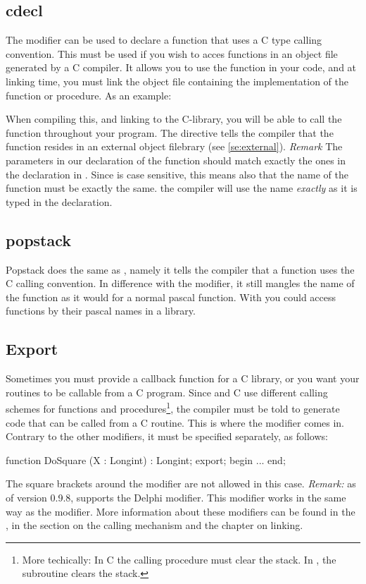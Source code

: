 \documentclass{report}
\begin{document}
\subsection{cdecl}
\label{se:cdecl}
The  modifier can be used to declare a function that uses a C
type calling convention. This must be used if you wish to acces functions in
an object file generated by a C compiler. It allows you to use the function in
your code, and at linking time, you must link the object file containing the
 implementation of the function or procedure.
As an example:
When compiling this, and linking to the C-library, you will be able to call
the  function throughout your program. The 
directive tells the compiler that the function resides in an external
object filebrary (see \ref{se:external}). 
{\em Remark} The parameters in our declaration of the  function should 
match exactly the ones in the declaration in . Since  is case 
sensitive, this means also that the name of the
function must be exactly the same. the \fpc compiler will use the name {\em
exactly} as it is typed in the declaration.
\subsection{popstack}
\label{se:popstack}
Popstack does the same as , namely it tells the \fpc compiler
that a function uses the C calling convention. In difference with the
 modifier, it still mangles the name of the function as it would 
for a normal pascal function.
With  you could access functions by their pascal names in a
library.
\subsection{Export}
Sometimes you must provide a callback function for a C library, or you want
your routines to be callable from a C program. Since \fpc and C use
different calling schemes for functions and procedures\footnote{More
techically: In C the calling procedure must clear the stack. In \fpc, the
subroutine clears the stack.}, the compiler must be told to generate code
that can be called from a C routine. This is where the  modifier
comes in. Contrary to the other modifiers, it must be specified separately,
as follows:
\begin{listing}
function DoSquare (X : Longint) : Longint; export;
begin
...
end;
\end{listing}
The square brackets around the modifier are not allowed in this case.
{\em Remark:}
as of version 0.9.8, \fpc supports the Delphi  modifier. 
This modifier works in the same way as the  modifier.
More information about these modifiers can be found in the \progref, in the
section on the calling mechanism and the chapter on linking.
\end{document}
